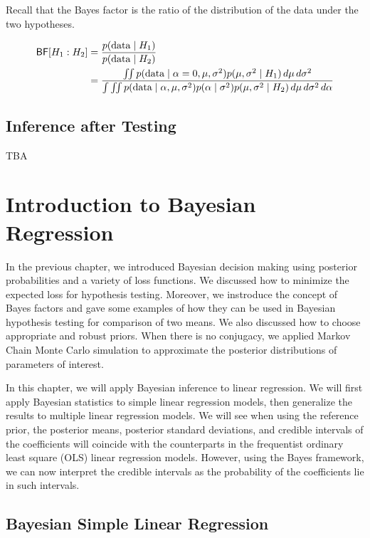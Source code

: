 \documentclass[]{book}
\theoremstyle{definition}
\theoremstyle{definition}
\theoremstyle{definition}
\theoremstyle{remark}
\begin{document}
Recall that the Bayes factor is the ratio of the distribution of the
data under the two hypotheses.

\[\begin{aligned}
 \textsf{BF}[H_1 : H_2] &=  \frac{p(\text{data} \mid H_1)} {p(\text{data} \mid H_2)} \\
  &= \frac{\iint p(\text{data} \mid \alpha = 0,\mu,  \sigma^2 )p(\mu, \sigma^2 \mid H_1) \, d\mu \,d\sigma^2}
 {\int \iint p(\text{data} \mid \alpha, \mu, \sigma^2) p(\alpha \mid \sigma^2) p(\mu, \sigma^2 \mid H_2) \, d \mu \, d\sigma^2 \, d \alpha}
\end{aligned}\]

\section{Inference after Testing}\label{inference-after-testing}

TBA

\chapter{Introduction to Bayesian
Regression}\label{introduction-to-bayesian-regression}

In the previous chapter, we introduced Bayesian decision making using
posterior probabilities and a variety of loss functions. We discussed
how to minimize the expected loss for hypothesis testing. Moreover, we
instroduce the concept of Bayes factors and gave some examples of how
they can be used in Bayesian hypothesis testing for comparison of two
means. We also discussed how to choose appropriate and robust priors.
When there is no conjugacy, we applied Markov Chain Monte Carlo
simulation to approximate the posterior distributions of parameters of
interest.

In this chapter, we will apply Bayesian inference to linear regression.
We will first apply Bayesian statistics to simple linear regression
models, then generalize the results to multiple linear regression
models. We will see when using the reference prior, the posterior means,
posterior standard deviations, and credible intervals of the
coefficients will coincide with the counterparts in the frequentist
ordinary least square (OLS) linear regression models. However, using the
Bayes framework, we can now interpret the credible intervals as the
probability of the coefficients lie in such intervals.

\section{Bayesian Simple Linear
Regression}\label{bayesian-simple-linear-regression}
\end{document}
